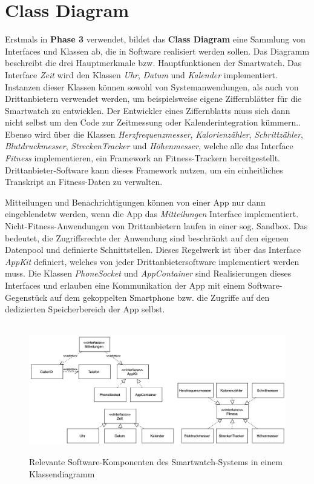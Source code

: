 \section{Class Diagram}

Erstmals in \textbf{Phase 3} verwendet, bildet das \textbf{Class Diagram} eine Sammlung von Interfaces und Klassen ab, die in Software realisiert werden sollen. Das Diagramm beschreibt die drei Hauptmerkmale bzw. Hauptfunktionen der Smartwatch. Das Interface \emph{Zeit} wird den Klassen \emph{Uhr}, \emph{Datum} und \emph{Kalender} implementiert. Instanzen dieser Klassen können sowohl von Systemanwendungen, als auch von Drittanbietern verwendet werden, um beispielsweise eigene Ziffernblätter für die Smartwatch zu entwicklen. Der Entwickler eines Ziffernblatts muss sich dann nicht selbst um den Code zur Zeitmessung oder Kalenderintegration kümmern.. Ebenso wird über die Klassen \emph{Herzfrequenzmesser}, \emph{Kalorienzähler}, \emph{Schrittzähler}, \emph{Blutdruckmesser}, \emph{StreckenTracker} und \emph{Höhenmesser}, welche alle das Interface \emph{Fitness} implementieren, ein Framework an Fitness-Trackern bereitgestellt. Drittanbieter-Software kann dieses Framework nutzen, um ein einheitliches Transkript an Fitness-Daten zu verwalten.

Mitteilungen und Benachrichtigungen können von einer App nur dann eingeblendetw werden, wenn die App das \emph{Mitteilungen} Interface implementiert. Nicht-Fitness-Anwendungen von Drittanbietern laufen in einer sog. \gls{Sandbox}. Das bedeutet, die Zugriffsrechte der Anwendung sind beschränkt auf den eigenen Datenpool und definierte Schnittstellen. Dieses Regelwerk ist über das Interface \emph{AppKit} definiert, welches von jeder Drittanbietersoftware implementiert werden muss. Die Klassen \emph{PhoneSocket} und \emph{AppContainer} sind Realisierungen dieses Interfaces und erlauben eine Kommunikation der App mit einem Software-Gegenstück auf dem gekoppelten Smartphone bzw. die Zugriffe auf den dedizierten Speicherbereich der App selbst.

\begin{figure}[h]
\centering\
\includegraphics[width=\textwidth]{img/classdiagram}
\caption{Relevante Software-Komponenten des Smartwatch-Systems in einem Klassendiagramm}\label{fig:class}
\end{figure}
